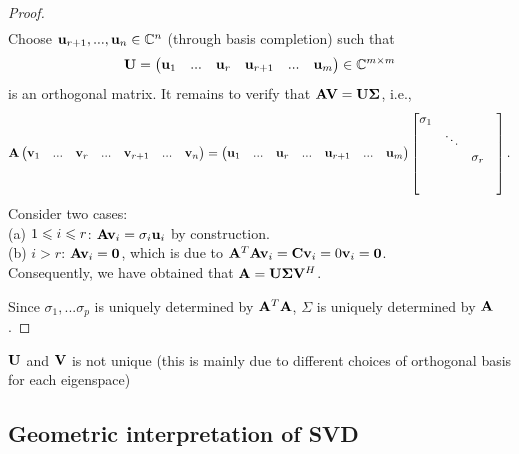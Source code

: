 \begin{proof}
\begin{align*}
    \end{align*}
    Choose $\bold{u}_{r+1},...,\bold{u}_n\in\mathbb{C}^n$ (through basis completion) such that
    \begin{align*}
        \bold{U} = \begin{pmatrix}
            \bold{u}_1 &...&\bold{u}_r&\bold{u}_{r+1}&...&\bold{u}_m
        \end{pmatrix}\in \mathbb{C}^{m\times m}
    \end{align*}
    is an orthogonal matrix.
    It remains to verify that $\bold{AV}=\bold{U\Sigma}$, i.e.,
    \begin{align*}
        \bold{A}\begin{pmatrix}
            \bold{v}_1&...&\bold{v}_r&...&\bold{v}_{r+1}&...&\bold{v}_n
        \end{pmatrix}
        =\begin{pmatrix}
            \bold{u}_1&...&\bold{u}_r&...&\bold{u}_{r+1}&...&\bold{u}_m
        \end{pmatrix}\begin{bmatrix}
            \sigma_{1} & & &\\
            & \ddots & &\\
            & & \sigma_{r} &\\
            & & & \\
            & & &
          \end{bmatrix}.
    \end{align*}
    Consider two cases:\\
     (a) $1\leqslant i\leqslant r$: $\bold{A}\bold{v}_i=\sigma_i\bold{u}_i$ by construction.\\
     (b) $i>r$: $\bold{A}\bold{v}_i=\bold{0}$, which is due to $\bold{A}^T\bold{A}\bold{v}_i=\bold{C}\bold{v}_i=0\bold{v}_i=\bold{0}$.\\
    Consequently, we have obtained that $\bold{A}=\bold{U\Sigma}\bold{V}^H$.
    \par
    Since $\sigma_1,...\sigma_p$ is uniquely determined by $\bold{A}^T\bold{A}$,
    $\Sigma$ is uniquely determined by $\bold{A}$.
\end{proof}

\begin{remark}
    $\bold{U}$ and $\bold{V}$ is not unique (this is mainly due to
    different choices of orthogonal basis for each eigenspace)
\end{remark}




\subsection{Geometric interpretation of SVD}

